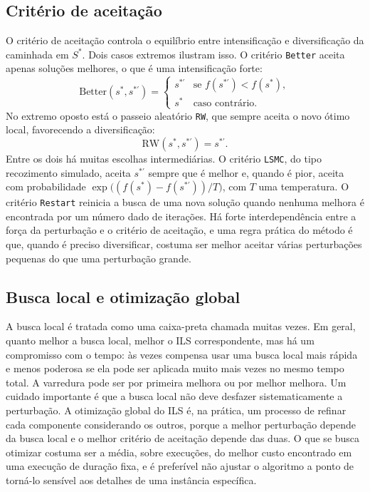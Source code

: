 \documentclass[11pt,a4paper]{article}
\newcommand{\code}[1]{\texttt{#1}}
\begin{document}
\subsection{Critério de aceitação}

O critério de aceitação controla o equilíbrio entre intensificação e diversificação da caminhada em $S^\ast$. Dois casos extremos ilustram isso. O critério \code{Better} aceita apenas soluções melhores, o que é uma intensificação forte:
\begin{equation}
\text{Better}(s^\ast, s^{\ast\prime}) =
\begin{cases}
s^{\ast\prime} & \text{se } f(s^{\ast\prime}) < f(s^\ast),\\
s^\ast & \text{caso contrário.}
\end{cases}
\label{eq:better}
\end{equation}
No extremo oposto está o passeio aleatório \code{RW}, que sempre aceita o novo ótimo local, favorecendo a diversificação:
\begin{equation}
\text{RW}(s^\ast, s^{\ast\prime}) = s^{\ast\prime}.
\end{equation}
Entre os dois há muitas escolhas intermediárias. O critério \code{LSMC}, do tipo recozimento simulado, aceita $s^{\ast\prime}$ sempre que é melhor e, quando é pior, aceita com probabilidade $\exp\!\big((f(s^\ast) - f(s^{\ast\prime}))/T\big)$, com $T$ uma temperatura. O critério \code{Restart} reinicia a busca de uma nova solução quando nenhuma melhora é encontrada por um número dado de iterações. Há forte interdependência entre a força da perturbação e o critério de aceitação, e uma regra prática do método é que, quando é preciso diversificar, costuma ser melhor aceitar várias perturbações pequenas do que uma perturbação grande.

\subsection{Busca local e otimização global}

A busca local é tratada como uma caixa-preta chamada muitas vezes. Em geral, quanto melhor a busca local, melhor o ILS correspondente, mas há um compromisso com o tempo: às vezes compensa usar uma busca local mais rápida e menos poderosa se ela pode ser aplicada muito mais vezes no mesmo tempo total. A varredura pode ser por primeira melhora ou por melhor melhora. Um cuidado importante é que a busca local não deve desfazer sistematicamente a perturbação. A otimização global do ILS é, na prática, um processo de refinar cada componente considerando os outros, porque a melhor perturbação depende da busca local e o melhor critério de aceitação depende das duas. O que se busca otimizar costuma ser a média, sobre execuções, do melhor custo encontrado em uma execução de duração fixa, e é preferível não ajustar o algoritmo a ponto de torná-lo sensível aos detalhes de uma instância específica.
\end{document}
